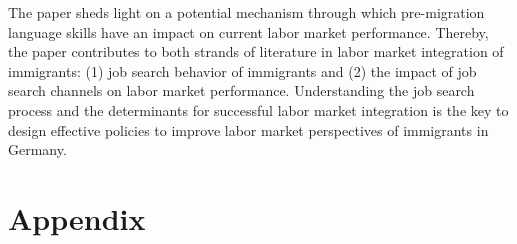 \documentclass[12pt,a4paper]{article}
\begin{document}
The paper sheds light on a potential mechanism through which pre-migration language skills have an impact on current labor market performance. Thereby, the paper contributes to both strands of literature in labor market integration of immigrants: (1) job search behavior of immigrants and (2) the impact of job search channels on labor market performance. Understanding the job search process and the determinants for successful labor market integration is the key to design effective policies to improve labor market perspectives of immigrants in Germany.

\section{Appendix}
\begin{center}
\begin{table}[htbp]
  \centering
  \caption{Summary Statistics}
\end{table}
\end{center}
\end{document}
